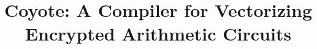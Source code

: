 \documentclass[pageno]{jpaper}
\title{Coyote: A Compiler for Vectorizing Encrypted Arithmetic Circuits}
\author{}
\date{}
\begin{document}
\maketitle









\appendix

\pagebreak
\clearpage
% 


\end{document}
